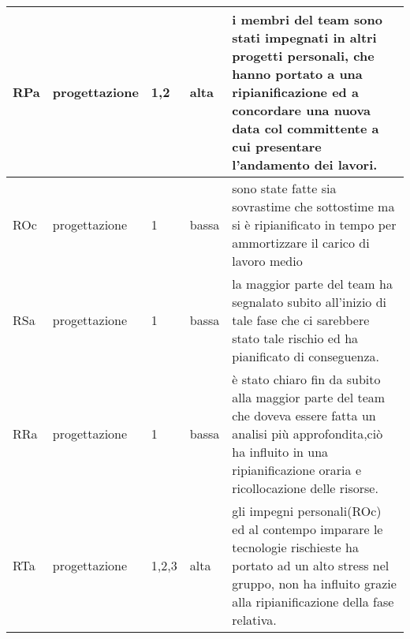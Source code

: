 {\begin{longtable}{|p{0.8cm}|p{2cm}|p{0.8cm}|p{0.8cm}|p{7.6cm}|}
        \hline
        RPa &
        progettazione &
        1,2 & 
        alta &
        i membri del team sono stati impegnati in altri progetti personali, che hanno portato a una ripianificazione ed a concordare una nuova data col committente a cui presentare l'andamento dei lavori.\\
        \hline
        ROc &
        progettazione &
        1 & 
        bassa &
        sono state fatte sia sovrastime che sottostime ma si è ripianificato in tempo per ammortizzare il carico di lavoro medio\\
        \hline
        RSa &
        progettazione &
        1 & 
        bassa &
        la maggior parte del team ha segnalato subito all'inizio di tale fase che ci sarebbere stato tale rischio ed ha pianificato di conseguenza. \\
        \hline
        RRa &
        progettazione &
        1 & 
        bassa & 
        è stato chiaro fin da subito alla maggior parte del team che doveva essere fatta un analisi più approfondita,ciò ha influito in una ripianificazione oraria e ricollocazione delle risorse.\\
        \hline
        RTa &
        progettazione &
        1,2,3 & 
        alta &
        gli impegni personali(ROc) ed al contempo imparare le tecnologie rischieste ha portato ad un alto stress nel gruppo, non ha influito grazie alla ripianificazione della fase relativa. \\
    \end{longtable}
}